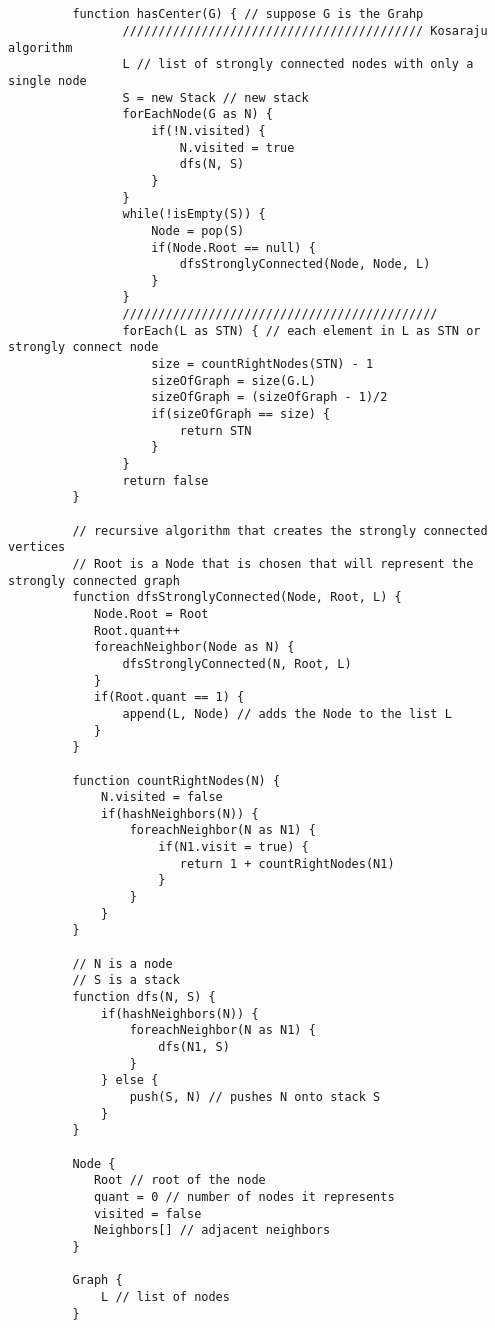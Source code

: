 \documentclass[11pt]{article}
\begin{document}
    \begin{verbatim}
        
         
         function hasCenter(G) { // suppose G is the Grahp
                ////////////////////////////////////////// Kosaraju algorithm
                L // list of strongly connected nodes with only a single node
                S = new Stack // new stack
                forEachNode(G as N) {
                    if(!N.visited) {
                        N.visited = true
                        dfs(N, S)
                    }
                }
                while(!isEmpty(S)) {
                    Node = pop(S)
                    if(Node.Root == null) {
                        dfsStronglyConnected(Node, Node, L)
                    }
                }
                ////////////////////////////////////////////
                forEach(L as STN) { // each element in L as STN or strongly connect node
                    size = countRightNodes(STN) - 1
                    sizeOfGraph = size(G.L)
                    sizeOfGraph = (sizeOfGraph - 1)/2
                    if(sizeOfGraph == size) {
                        return STN
                    }
                }
                return false
         }

         // recursive algorithm that creates the strongly connected vertices
         // Root is a Node that is chosen that will represent the strongly connected graph
         function dfsStronglyConnected(Node, Root, L) { 
            Node.Root = Root
            Root.quant++
            foreachNeighbor(Node as N) {
                dfsStronglyConnected(N, Root, L)
            }
            if(Root.quant == 1) {
                append(L, Node) // adds the Node to the list L
            }
         }

         function countRightNodes(N) {
             N.visited = false
             if(hashNeighbors(N)) {
                 foreachNeighbor(N as N1) {
                     if(N1.visit = true) {
                        return 1 + countRightNodes(N1)
                     }
                 }
             }
         }

         // N is a node
         // S is a stack
         function dfs(N, S) {
             if(hashNeighbors(N)) {
                 foreachNeighbor(N as N1) {
                     dfs(N1, S)
                 }
             } else {
                 push(S, N) // pushes N onto stack S
             }
         }  

         Node {
            Root // root of the node
            quant = 0 // number of nodes it represents
            visited = false
            Neighbors[] // adjacent neighbors
         }

         Graph {
             L // list of nodes
         }
 
     \end{verbatim}
\end{document}
